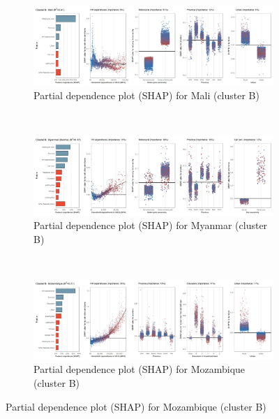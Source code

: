 \begin{figure}[ht!]\ContinuedFloat
    \centering
   \begin{subfigure}[b]{\textwidth}
  \centering
         \caption{Partial dependence plot (SHAP) for Mali (cluster B)}
         \label{fig:5b_MLI}
         \includegraphics[width=\textwidth]{Figure 5b/Figure_5b_MLI} \end{subfigure}
    \\
    \vspace{0.5cm}
   \begin{subfigure}[b]{\textwidth}
    \centering
         \caption{Partial dependence plot (SHAP) for Myanmar (cluster B)}
         \label{fig:5b_MMR}
         \includegraphics[width=\textwidth]{Figure 5b/Figure_5b_MMR}         
     \end{subfigure}
    \\
    \vspace{0.5cm}
   \begin{subfigure}[b]{\textwidth}
   \centering
         \caption{Partial dependence plot (SHAP) for Mozambique (cluster B)}
         \label{fig:5b_MOZ}
         \includegraphics[width=\textwidth]{Figure 5b/Figure_5b_MOZ}
         \end{subfigure}

\end{figure}

